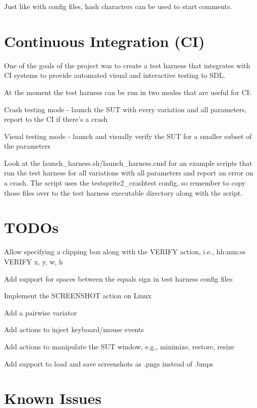 Just like with config files, hash characters can be used to start comments.\hypertarget{index_contint_sec}{}\section{Continuous Integration (\-C\-I)}\label{index_contint_sec}
One of the goals of the project was to create a test harness that integrates with C\-I systems to provide automated visual and interactive testing to S\-D\-L.

At the moment the test harness can be run in two modes that are useful for C\-I\-: \begin{DoxyItemize}
\item Crash testing mode -\/ launch the S\-U\-T with every variation and all parameters, report to the C\-I if there's a crash \item Visual testing mode -\/ launch and visually verify the S\-U\-T for a smaller subset of the parameters\end{DoxyItemize}
Look at the launch\-\_\-harness.\-sh/launch\-\_\-harness.cmd for an example scripts that run the test harness for all variations with all parameters and report an error on a crash. The script uses the testsprite2\-\_\-crashtest config, so remember to copy those files over to the test harness executable directory along with the script.\hypertarget{index_todo_sec}{}\section{T\-O\-D\-Os}\label{index_todo_sec}
\begin{DoxyItemize}
\item Allow specifying a clipping box along with the V\-E\-R\-I\-F\-Y action, i.\-e., hh\-:mm\-:ss V\-E\-R\-I\-F\-Y x, y, w, h \item Add support for spaces between the equals sign in test harness config files \item Implement the S\-C\-R\-E\-E\-N\-S\-H\-O\-T action on Linux \item Add a pairwise variator \item Add actions to inject keyboard/mouse events \item Add actions to manipulate the S\-U\-T window, e.\-g., minimize, restore, resize \item Add support to load and save screenshots as .pngs instead of .bmps\end{DoxyItemize}
\hypertarget{index_issues_sec}{}\section{Known Issues}\label{index_issues_sec}
